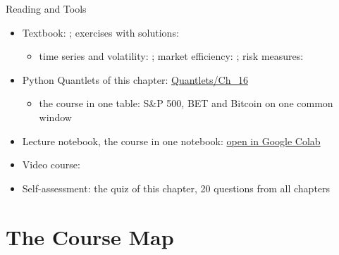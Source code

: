 \begin{frame}{Reading and Tools}
\itemsize{\small}
\begin{itemize}
    \item Textbook: ; exercises with solutions: 
    \begin{itemize}
        \item time series and volatility: ; market efficiency: ; risk measures: 
    \end{itemize}
    \item Python Quantlets of this chapter: \href{https://github.com/danpele/SFM/tree/main/Quantlets/Ch_16}{Quantlets/Ch\_16}
    \begin{itemize}
        \item the course in one table: S\&P 500, BET and Bitcoin on one common window
    \end{itemize}
    \item Lecture notebook, the course in one notebook: \href{\colaburl{notebooks/EN/chapter16_lecture_notebook.ipynb}}{open in Google Colab}
    \item Video course: 
    \item Self-assessment: the quiz of this chapter, 20 questions from all chapters
\end{itemize}
\end{frame}


\section{The Course Map}

